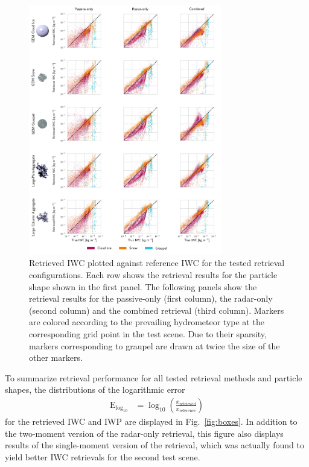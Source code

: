 \documentclass[journal abbreviation, manuscript]{copernicus}
\begin{document}
\begin{figure}
\centering \includegraphics[width = 0.75\textwidth]{../plots/results_scatter_a}
\caption{Retrieved IWC plotted against reference IWC for the tested retrieval
  configurations. Each row shows the retrieval results for the particle shape
  shown in the first panel. The following panels show the retrieval results for
  the passive-only (first column), the radar-only (second column) and the
  combined retrieval (third column). Markers are colored according to the
  prevailing hydrometeor type at the corresponding grid point in the test
  scene. Due to their sparsity, markers corresponding to graupel are drawn at
  twice the size of the other markers.}
\label{fig:results_scatter_a}
\end{figure}

To summarize retrieval performance for all tested retrieval methods and particle
shapes, the distributions of the logarithmic error
\begin{align}
  \text{E}_{\text{log}_{10}} &= \log_\text{10} \left
  (\frac{x_\text{retrieved}}{x_\text{reference}} \right )
\end{align}
for the retrieved IWC and IWP are displayed in Fig.~\ref{fig:boxes}. In addition
to the two-moment version of the radar-only retrieval, this figure also displays
results of the single-moment version of the retrieval, which was actually found
to yield better IWC retrievals for the second test scene.
\end{document}

